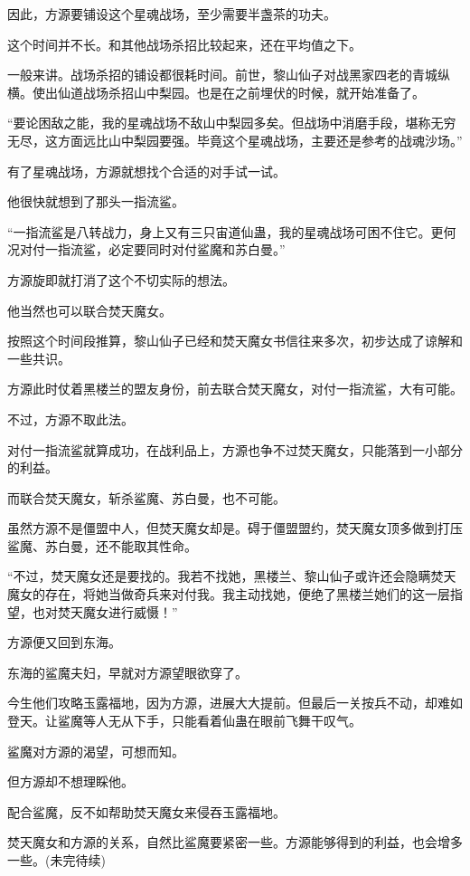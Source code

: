 \begin{this_body}
因此，方源要铺设这个星魂战场，至少需要半盏茶的功夫。

这个时间并不长。和其他战场杀招比较起来，还在平均值之下。

一般来讲。战场杀招的铺设都很耗时间。前世，黎山仙子对战黑家四老的青城纵横。使出仙道战场杀招山中梨园。也是在之前埋伏的时候，就开始准备了。

“要论困敌之能，我的星魂战场不敌山中梨园多矣。但战场中消磨手段，堪称无穷无尽，这方面远比山中梨园要强。毕竟这个星魂战场，主要还是参考的战魂沙场。”

有了星魂战场，方源就想找个合适的对手试一试。

他很快就想到了那头一指流鲨。

“一指流鲨是八转战力，身上又有三只宙道仙蛊，我的星魂战场可困不住它。更何况对付一指流鲨，必定要同时对付鲨魔和苏白曼。”

方源旋即就打消了这个不切实际的想法。

他当然也可以联合焚天魔女。

按照这个时间段推算，黎山仙子已经和焚天魔女书信往来多次，初步达成了谅解和一些共识。

方源此时仗着黑楼兰的盟友身份，前去联合焚天魔女，对付一指流鲨，大有可能。

不过，方源不取此法。

对付一指流鲨就算成功，在战利品上，方源也争不过焚天魔女，只能落到一小部分的利益。

而联合焚天魔女，斩杀鲨魔、苏白曼，也不可能。

虽然方源不是僵盟中人，但焚天魔女却是。碍于僵盟盟约，焚天魔女顶多做到打压鲨魔、苏白曼，还不能取其性命。

“不过，焚天魔女还是要找的。我若不找她，黑楼兰、黎山仙子或许还会隐瞒焚天魔女的存在，将她当做奇兵来对付我。我主动找她，便绝了黑楼兰她们的这一层指望，也对焚天魔女进行威慑！”

方源便又回到东海。

东海的鲨魔夫妇，早就对方源望眼欲穿了。

今生他们攻略玉露福地，因为方源，进展大大提前。但最后一关按兵不动，却难如登天。让鲨魔等人无从下手，只能看着仙蛊在眼前飞舞干叹气。

鲨魔对方源的渴望，可想而知。

但方源却不想理睬他。

配合鲨魔，反不如帮助焚天魔女来侵吞玉露福地。

焚天魔女和方源的关系，自然比鲨魔要紧密一些。方源能够得到的利益，也会增多一些。(未完待续)

\end{this_body}

